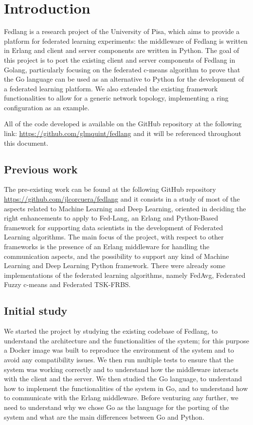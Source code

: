 \chapter{Introduction}
Fedlang is a research project of the University of Pisa, which aims to provide a platform for federated learning experiments:
the middleware of Fedlang is written in Erlang and client and server components are written in Python.
The goal of this project is to port the existing client and server components of Fedlang in Golang, particularly focusing on the federated c-means algorithm to prove that the Go language can be used as an alternative to Python for the development of a federated learning platform. 
We also extended the existing framework functionalities to allow for a generic network topology, implementing a ring configuration as an example.

All of the code developed is available on the GitHub repository at the following link: \url{https://github.com/glmquint/fedlang} and it will be referenced throughout this document.

\section{Previous work}
The pre-existing work can be found at the following GitHub repository \url{https://github.com/jlcorcuera/fedlang} and it consists in a study of most of the aspects related to Machine Learning and Deep Learning, oriented in deciding the right enhancements to apply to Fed-Lang, an Erlang and Python-Based framework for supporting data scientists in the development of Federated Learning algorithms. The main focus of the project, with respect to other frameworks is the presence of an Erlang middleware for handling the communication aspects, and the possibility to support any kind of Machine Learning and Deep Learning Python framework. There were already some implementations of the federated learning algorithms, namely FedAvg, Federated Fuzzy c-means and Federated TSK-FRBS.

\section{Initial study}
We started the project by studying the existing codebase of Fedlang, to understand the architecture and the functionalities of the system; for this purpose a Docker image was built to reproduce the environment of the system and to avoid any compatibility issues.
We then run multiple tests to ensure that the system was working correctly and to understand how the middleware interacts with the client and the server. 
We then studied the Go language, to understand how to implement the functionalities of the system in Go, and to understand how to communicate with the Erlang middleware. Before venturing any further, we need to understand why we chose Go as the language for the porting of the system and what are the main differences between Go and Python.

